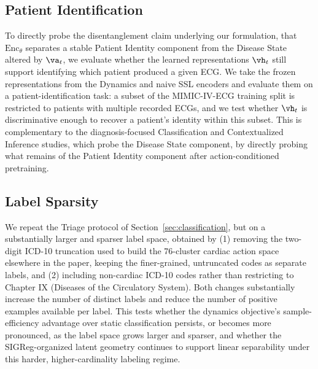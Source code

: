 \subsection{Patient Identification}

To directly probe the disentanglement claim underlying our formulation, that $\text{Enc}_\theta$ separates a stable Patient Identity component from the Disease State altered by $\va_t$, we evaluate whether the learned representations $\vh_t$ still support identifying which patient produced a given ECG. We take the frozen representations from the Dynamics and naive SSL encoders and evaluate them on a patient-identification task: a subset of the MIMIC-IV-ECG training split is restricted to patients with multiple recorded ECGs, and we test whether $\vh_t$ is discriminative enough to recover a patient's identity within this subset. This is complementary to the diagnosis-focused Classification and Contextualized Inference studies, which probe the Disease State component, by directly probing what remains of the Patient Identity component after action-conditioned pretraining.

\subsection{Label Sparsity}

We repeat the Triage protocol of Section~\ref{sec:classification}, but on a substantially larger and sparser label space, obtained by (1) removing the two-digit ICD-10 truncation used to build the 76-cluster cardiac action space elsewhere in the paper, keeping the finer-grained, untruncated codes as separate labels, and (2) including non-cardiac ICD-10 codes rather than restricting to Chapter IX (Diseases of the Circulatory System). Both changes substantially increase the number of distinct labels and reduce the number of positive examples available per label. This tests whether the dynamics objective's sample-efficiency advantage over static classification persists, or becomes more pronounced, as the label space grows larger and sparser, and whether the SIGReg-organized latent geometry continues to support linear separability under this harder, higher-cardinality labeling regime.
